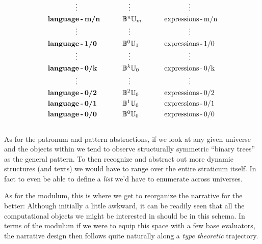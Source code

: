 \documentclass[twoside]{article}
\newcommand{\bfmbox}[1]{\mbox{\bfseries #1}}
\newcommand{\nthbs}[2][B]{\ensuremath{\mathbb{#1}^{#2}}}
\newcommand{\nthus}[2][U]{\ensuremath{\mathbb{#1}_{#2}}}
\newcommand{\tab}[1][1.125cm]{\hspace{#1}}
\newcommand{\col}[1][0ex]{& \hspace{#1}}
\begin{document}
$$ \def\arraystretch{1.25}
\begin{array}{lll}

\tab[9ex] \vdots		\col[7ex] \vdots			\col[13ex] \vdots				\\

\bfmbox{language\,-\,m/n}	\col[5ex] \nthbs{n}\nthus{m}		\col[5ex] \mbox{expressions\,-\,m/n}		\\

\tab[9ex] \vdots		\col[7ex] \vdots			\col[13ex] \vdots		  	    	\\

\bfmbox{language\,-\,1/0}	\col[5ex] \nthbs{0}\nthus{1}		\col[5ex] \mbox{expressions\,-\,1/0}		\\

\tab[9ex] \vdots		\col[7ex] \vdots			\col[13ex] \vdots		      		\\

\bfmbox{language\,-\,0/k}	\col[5ex] \nthbs{k}\nthus{0}		\col[5ex] \mbox{expressions\,-\,0/k}		\\

\tab[9ex] \vdots		\col[7ex] \vdots			\col[13ex] \vdots		      		\\

\bfmbox{language\,-\,0/2}	\col[5ex] \nthbs{2}\nthus{0}		\col[5ex] \mbox{expressions\,-\,0/2}		\\
\bfmbox{language\,-\,0/1}	\col[5ex] \nthbs{1}\nthus{0}		\col[5ex] \mbox{expressions\,-\,0/1}		\\
\bfmbox{language\,-\,0/0}	\col[5ex] \nthbs{0}\nthus{0}		\col[5ex] \mbox{expressions\,-\,0/0}		\\
\end{array} $$
\ \\

As for the patronum and pattern abstractions, if we look at any given universe and the objects within we tend to
observe structurally symmetric ``binary trees'' as the general pattern. To then recognize and abstract out more dynamic
structures (and texts) we would have to range over the entire straticum itself. In fact to even be able to define
a \emph{list} we'd have to enumerate across universes.

As for the modulum, this is where we get to reorganize the narrative for the better: Although initially a little awkward,
it can be readily seen that all the computational objects we might be interested in should be in this schema. In terms
of the modulum if we were to equip this space with a few base evaluators, the narrative design then follows quite naturally
along a \emph{type theoretic} trajectory.
\end{document}
